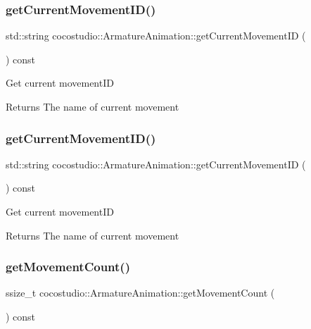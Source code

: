 \subsubsection{\texorpdfstring{get\+Current\+Movement\+I\+D()}{getCurrentMovementID()}\hspace{0.1cm}{\footnotesize\ttfamily [1/2]}}
{\footnotesize\ttfamily std\+::string cocostudio\+::\+Armature\+Animation\+::get\+Current\+Movement\+ID (\begin{DoxyParamCaption}{ }\end{DoxyParamCaption}) const}

Get current movement\+ID \begin{DoxyReturn}{Returns}
The name of current movement 
\end{DoxyReturn}
\mbox{\label{classcocostudio_1_1ArmatureAnimation_a62ad0fdb64386138a022e4fca276f499}} 
\subsubsection{\texorpdfstring{get\+Current\+Movement\+I\+D()}{getCurrentMovementID()}\hspace{0.1cm}{\footnotesize\ttfamily [2/2]}}
{\footnotesize\ttfamily std\+::string cocostudio\+::\+Armature\+Animation\+::get\+Current\+Movement\+ID (\begin{DoxyParamCaption}{ }\end{DoxyParamCaption}) const}

Get current movement\+ID \begin{DoxyReturn}{Returns}
The name of current movement 
\end{DoxyReturn}
\mbox{\label{classcocostudio_1_1ArmatureAnimation_a1f32fed1a5f939a878df9f8355c412e3}} 
\subsubsection{\texorpdfstring{get\+Movement\+Count()}{getMovementCount()}\hspace{0.1cm}{\footnotesize\ttfamily [1/2]}}
{\footnotesize\ttfamily ssize\+\_\+t cocostudio\+::\+Armature\+Animation\+::get\+Movement\+Count (\begin{DoxyParamCaption}{ }\end{DoxyParamCaption}) const}

